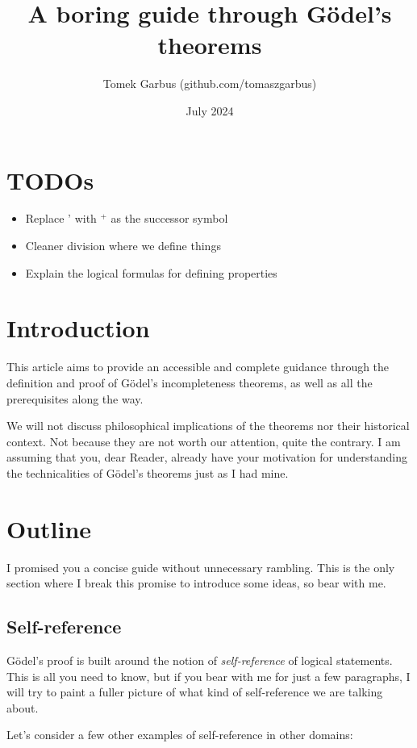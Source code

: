 \documentclass{article}
\title{A \textbf{boring} guide through Gödel's theorems}
\author{Tomek Garbus (github.com/tomaszgarbus)}
\date{July 2024}
\begin{document}
\maketitle

\section{TODOs}

\begin{itemize}
    \item Replace ' with $^+$ as the successor symbol
    \item Cleaner division where we define things
    \item Explain the logical formulas for defining properties
\end{itemize}

\section{Introduction}
This article aims to provide an accessible and complete guidance
through the definition and proof of Gödel's incompleteness theorems, as well
as all the prerequisites along the way.

We will not discuss philosophical implications of the theorems nor their
historical context. Not because they are not worth our attention, quite the contrary.
I am assuming that you, dear Reader, already have your motivation for understanding the
technicalities of Gödel's theorems just as I had mine.

\section{Outline}

I promised you a concise guide without unnecessary rambling. This is the only section where
I break this promise to introduce some ideas, so bear with me.

\subsection{Self-reference}

Gödel's proof is built around the notion of \textit{self-reference} of logical statements.
This is all you need to know, but if you bear with me for just a few paragraphs, I will try
to paint a fuller picture of what kind of self-reference we are talking about.

Let's consider a few other examples of self-reference in other domains:
\end{document}

